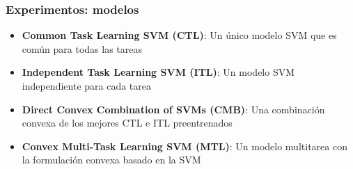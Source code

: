 \documentclass[aspectratio=43,spanish]{beamer}
\newcommand{\fmaxn}[1]{\textbf{#1}}
\newcommand{\fmod}[1]{\textsf{#1}}
\begin{document}



\begin{frame}
      \frametitle{Experimentos: modelos}
  
  \begin{itemize}
      \item \textbf{Common Task Learning SVM (\fmod{CTL})}: Un único modelo SVM que es común para todas las tareas
      \item \textbf{Independent Task Learning SVM (\fmod{ITL})}: Un modelo SVM independiente para cada tarea
      \item \textbf{Direct Convex Combination of SVMs (\fmod{CMB})}: Una combinación convexa de los mejores \fmod{CTL} e \fmod{ITL} preentrenados
      \item \textbf{Convex Multi-Task Learning SVM (\fmod{MTL})}: Un modelo multitarea con la formulación convexa basado en la SVM
  
  \end{itemize}   
  
  \end{frame}
  
\end{document}
